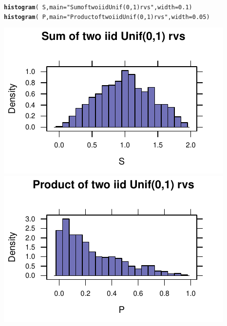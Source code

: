 \documentclass[twoside]{book}\usepackage[]{graphicx}\usepackage[]{xcolor}
\makeatletter
\def\maxwidth{ %
  \ifdim\Gin@nat@width>\linewidth
    \linewidth
  \else
    \Gin@nat@width
  \fi
}
\newcommand{\hlnum}[1]{\textcolor[rgb]{0.686,0.059,0.569}{#1}}%
\newcommand{\hlstr}[1]{\textcolor[rgb]{0.192,0.494,0.8}{#1}}%
\newcommand{\hlopt}[1]{\textcolor[rgb]{0,0,0}{#1}}%
\newcommand{\hlstd}[1]{\textcolor[rgb]{0.345,0.345,0.345}{#1}}%
\newcommand{\hlkwc}[1]{\textcolor[rgb]{0.333,0.667,0.333}{#1}}%
\newcommand{\hlkwd}[1]{\textcolor[rgb]{0.737,0.353,0.396}{\textbf{#1}}}%
\newenvironment{kframe}{%
 \def\at@end@of@kframe{}%
 \ifinner\ifhmode%
  \def\at@end@of@kframe{\end{minipage}}%
  \begin{minipage}{\columnwidth}%
 \fi\fi%
 \def\FrameCommand##1{\hskip\@totalleftmargin \hskip-\fboxsep
 \colorbox{shadecolor}{##1}\hskip-\fboxsep
     \hskip-\linewidth \hskip-\@totalleftmargin \hskip\columnwidth}%
 \MakeFramed {\advance\hsize-\width
   \@totalleftmargin\z@ \linewidth\hsize
   \@setminipage}}%
 {\par\unskip\endMakeFramed%
 \at@end@of@kframe}
\newenvironment{knitrout}{}{} %
\makeatother
\begin{document}
\begin{knitrout}
\color{fgcolor}\begin{kframe}
\begin{alltt}
\hlkwd{histogram}\hlstd{(} \hlopt{~} \hlstd{S ,} \hlkwc{main}\hlstd{=}\hlstr{"Sum of two iid Unif(0,1) rvs"}\hlstd{,} \hlkwc{width}\hlstd{=}\hlnum{0.1}\hlstd{)}
\hlkwd{histogram}\hlstd{(} \hlopt{~} \hlstd{P ,} \hlkwc{main}\hlstd{=}\hlstr{"Product of two iid Unif(0,1) rvs"}\hlstd{,} \hlkwc{width}\hlstd{=}\hlnum{0.05}\hlstd{)}
\end{alltt}
\end{kframe}

{\centering \includegraphics[width=\maxwidth]{figures/fig-sum-product-uniform-iid-1} 
\includegraphics[width=\maxwidth]{figures/fig-sum-product-uniform-iid-2} 

}



\end{knitrout}
\end{document}
